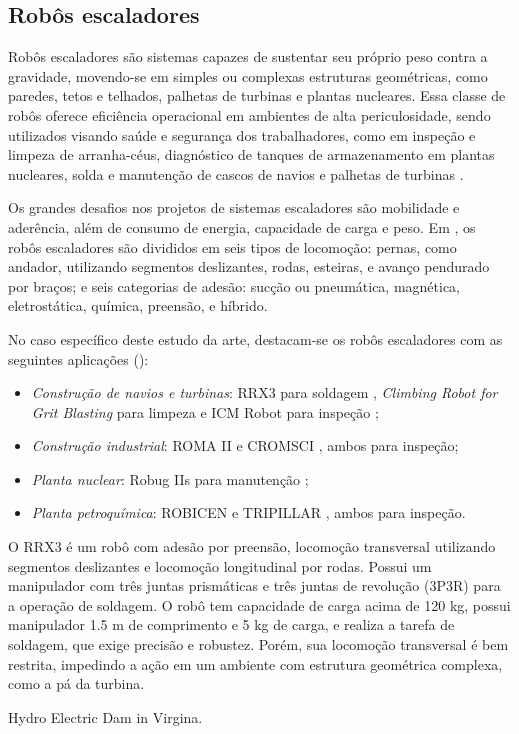 \subsection{Robôs escaladores}
Robôs escaladores são sistemas capazes de sustentar seu próprio peso contra a
gravidade, movendo-se em simples ou complexas estruturas geométricas, como
paredes, tetos e telhados, palhetas de turbinas e plantas nucleares.
Essa classe de robôs oferece eficiência operacional em ambientes
de alta periculosidade, sendo utilizados visando saúde e segurança dos
trabalhadores, como em inspeção e limpeza de arranha-céus, diagnóstico de
tanques de armazenamento em plantas nucleares, solda e manutenção de cascos de
navios e palhetas de turbinas \cite{clawar}.

Os grandes desafios nos projetos de sistemas escaladores são mobilidade e
aderência, além de consumo de energia, capacidade de carga e peso. Em
\cite{modular}, os robôs escaladores são divididos em seis tipos de locomoção:
pernas, como andador, utilizando segmentos deslizantes, rodas, esteiras, e
avanço pendurado por braços; e seis categorias de adesão: sucção ou pneumática,
magnética, eletrostática, química, preensão, e híbrido.

No caso específico deste estudo da arte, destacam-se os robôs escaladores com as
seguintes aplicações (\cite{climbsurv}):

\begin{itemize}
  \item \emph{Construção de navios e turbinas}: RRX3 para soldagem
  \citep{rrx3}, \emph{Climbing Robot for Grit Blasting} para limpeza
  \citep{crgb} e ICM Robot para inspeção \citep{icm};
  \item \emph{Construção industrial}: ROMA II \citep{roma} e
  CROMSCI \citep{CROMSCI}, ambos para inspeção;
 \item \emph{Planta nuclear}: Robug IIs para manutenção \citep{robug}; 
 \item \emph{Planta petroquímica}: ROBICEN \citep{robicen} e
  TRIPILLAR \citep{tripillar}, ambos para inspeção.  
\end{itemize}

O RRX3 é um robô com adesão por preensão, locomoção transversal utilizando
segmentos deslizantes e locomoção longitudinal por rodas. Possui um manipulador
com três juntas prismáticas e três juntas de revolução (3P3R) para a operação de
soldagem. O robô tem capacidade de carga acima de 120 kg, possui manipulador
1.5 m de comprimento e 5 kg de carga, e realiza a tarefa de soldagem, que exige
precisão e robustez. Porém, sua locomoção transversal é bem restrita, impedindo
a ação em um ambiente com estrutura geométrica complexa, como a pá da turbina.







 Hydro Electric Dam in Virgina.
